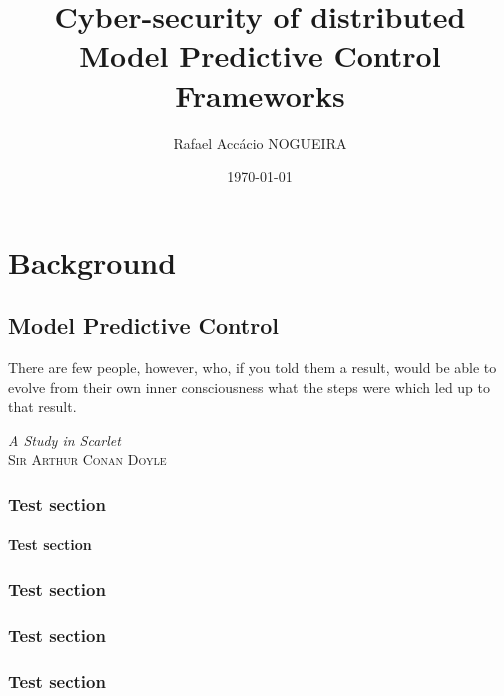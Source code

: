 \documentclass{these-dbl}
\author{Rafael Accácio NOGUEIRA}
\title{Cyber-security of distributed Model Predictive Control Frameworks}
\date{\today}
\begin{document}
\dominitoc

\maketitle
{}

\frontmatter
% 

\tableofcontents

% 

\listofacronyms
\listoffigures
\listoftables
\printglossary




\mainmatter

% 


\part{Background}
\minitoc
\chapter{Model Predictive Control}
\epigraph{\centering There are few people, however, who, if you told them a result, would be able to evolve from their own inner consciousness what the steps were which led up to that result.}
{\textit{A Study in Scarlet}\\ \textsc{Sir Arthur Conan Doyle}}
\minitoc

\section{Test section}

\subsection{Test section}
\section{Test section}
\section{Test section}
\section{Test section}
\end{document}
